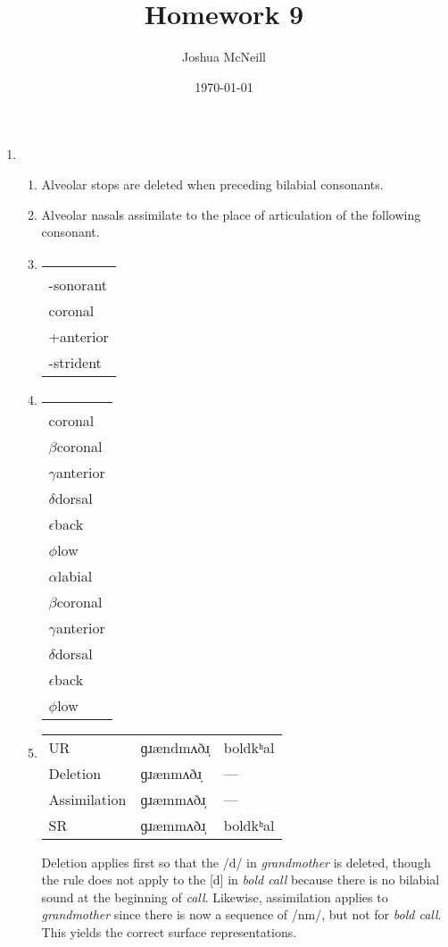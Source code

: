 \documentclass{article}
\author{Joshua McNeill}
\title{Homework 9}
\date{\today}
\newcommand{\rulealign}[1]{
    \begin{tabular}[t]{l}
      \\
      #1
    \end{tabular}
  }
\begin{document}
  \maketitle
  \begin{enumerate}
    \item
    \begin{enumerate}
      \item Alveolar stops are deleted when preceding bilabial consonants.
      \item Alveolar nasals assimilate to the place of articulation of the following consonant.
      \item \rulealign{
        \phonr{\phonfeat[l]{-continuant \\ -sonorant \\ coronal \\ +anterior}}{ø}{\phonfeat[l]{+labial \\ -strident}}
      }
      \item \rulealign{
        \phonr{\phonfeat[l]{nasal \\ coronal}}{\phonfeat[l]{$\alpha$labial \\ $\beta$coronal \\ $\gamma$anterior \\ $\delta$dorsal \\ $\epsilon$back \\ $\phi$low}}{\phonfeat[l]{-syllabic \\ $\alpha$labial \\ $\beta$coronal \\ $\gamma$anterior \\ $\delta$dorsal \\ $\epsilon$back \\ $\phi$low}}
        \vspace{2cm}
      }
      \item
      \begin{tabular}[t]{l l l}
        UR           & ɡɹændmʌðɹ̩ & boldkʰal \\
        Deletion     & ɡɹænmʌðɹ̩  & --- \\
        Assimilation & ɡɹæmmʌðɹ̩  & --- \\
        SR           & ɡɹæmmʌðɹ̩  & boldkʰal
      \end{tabular}
      Deletion applies first so that the /d/ in \emph{grandmother} is deleted, though the rule does not apply to the [d] in \emph{bold call} because there is no bilabial sound at the beginning of \emph{call}. Likewise, assimilation applies to \emph{grandmother} since there is now a sequence of /nm/, but not for \emph{bold call}. This yields the correct surface representations.

\end{enumerate}
\end{enumerate}
\end{document}
